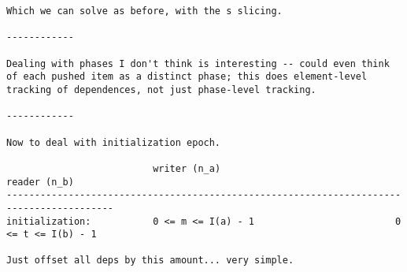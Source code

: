 \begin{verbatim}
Which we can solve as before, with the s slicing.

------------

Dealing with phases I don't think is interesting -- could even think
of each pushed item as a distinct phase; this does element-level
tracking of dependences, not just phase-level tracking.

------------

Now to deal with initialization epoch.

                          writer (n_a)                               reader (n_b)
-----------------------------------------------------------------------------------------
initialization:           0 <= m <= I(a) - 1                         0 <= t <= I(b) - 1

Just offset all deps by this amount... very simple.

\end{verbatim}
